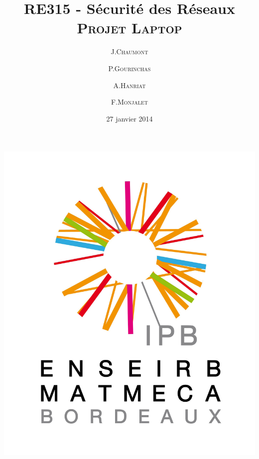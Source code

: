 \documentclass[red]{beamer}
\title[RE315 : Laptop]{RE315 - Sécurité des Réseaux\\
                       \textsc{Projet Laptop}}
\author{J.\textsc{Chaumont} \and P.\textsc{Gourinchas}\\
        \and A.\textsc{Hanriat} \and F.\textsc{Monjalet}}
\institute{ENSEIRB-MATMECA}
\date{27 janvier 2014}
\begin{document}
{
\logo{}
\begin{frame}
    \vspace{-0.2cm}
    \maketitle
    \vspace{-0.7cm}
    \begin{center}
        \includegraphics[height=0.29\textheight]{img/logo.jpg}

    \end{center}
\end{frame}
}

\addtocounter{framenumber}{-1}
\end{document}
